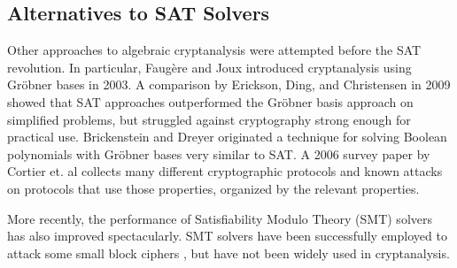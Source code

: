 \subsection{Alternatives to SAT Solvers}
\label{sec:related:otherattacks}
Other approaches to algebraic cryptanalysis were attempted before the SAT revolution. In particular, Faug\`{e}re and Joux \cite{FJ03} introduced cryptanalysis using Gr\"{o}bner bases in 2003. A comparison by Erickson, Ding, and Christensen \cite{EDC09} in 2009 showed that SAT approaches outperformed the Gr\"{o}bner basis approach on simplified problems, but struggled against cryptography strong enough for practical use. Brickenstein and Dreyer \cite{BD09} originated a technique for solving Boolean polynomials with Gr\"{o}bner bases very similar to SAT. A 2006 survey paper by Cortier et. al \cite{CDL06} collects many different cryptographic protocols and known attacks on protocols that use those properties, organized by the relevant properties.

More recently, the performance of Satisfiability Modulo Theory (SMT) solvers has also improved spectacularly. \cite{BDMOS12} SMT solvers have been successfully employed to attack some small block ciphers \cite{Stanek14}, but have not been widely used in cryptanalysis.